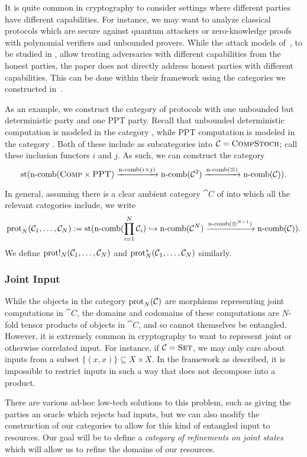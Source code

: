 It is quite common in cryptography to consider settings where different parties
have different capabilities. For instance, we may want to analyze classical
protocols which are secure against quantum attackers or zero-knowledge proofs
with polynomial verifiers and unbounded provers. While the attack models
of~\cite{broadbent-karvonen-2022}, to be studied in
, allow treating
adversaries with different capabilities from the honest parties, the paper does
not directly address honest parties with different capabilities. This can be
done within their framework using the categories we constructed
in~.

As an example, we construct the category of protocols with one unbounded but
deterministic party and one PPT party. Recall that unbounded deterministic
computation is modeled in the category , while PPT computation is
modeled in the category . Both of these include as subcategories into
${\mathcal{C}} = {\textsc{\text{CompStoch}}}$; call these inclusion functors $i$ and $j$. As such, we can
construct the category \[
  \operatorname*{st}(\operatorname*{n-comb}({\textsc{\text{Comp}}}\times{\textsc{\text{PPT}}})\xrightarrow{\operatorname*{n-comb}(i\times
    j)}\operatorname*{n-comb}({\mathcal{C}}^2)\xrightarrow{\operatorname*{n-comb}(\otimes)}\operatorname*{n-comb}({\mathcal{C}})).
\]

In general, assuming there is a clear ambient category $\cat{C}$ of
into which all the relevant categories include, we write \[
  \operatorname{prot}_{N}({\mathcal{C}}_1,\dots,{\mathcal{C}}_N) := \operatorname*{st}(\operatorname*{n-comb}(\prod_{i=1}^N
  {\mathcal{C}}_i)\hookrightarrow\operatorname*{n-comb}({\mathcal{C}}^N)\xrightarrow{\operatorname*{n-comb}(\otimes^{N-1})}\operatorname*{n-comb}({\mathcal{C}})).
\]
We define $\operatorname{prot}!_{N}({\mathcal{C}}_1,\dots,{\mathcal{C}}_N)$ and
$\operatorname{prot}^*_{N}({\mathcal{C}}_1,\dots,{\mathcal{C}}_N)$ similarly.

\subsubsection{Joint Input}

While the objects in the category $\operatorname{prot}_{N}({\mathcal{C}})$ are morphisms representing
joint computations in $\cat{C}$, the domains and codomains of these computations
are $N$-fold tensor products of objects in $\cat{C}$, and so cannot themselves be
entangled. However, it is extremely common in cryptography to want to represent
joint or otherwise correlated input. For instance, if ${\mathcal{C}} =
{\textsc{\text{Set}}}$, we may only care about inputs from a subset $\{(x, x)\}\subseteq
X\times X$. In the framework as described, it is impossible to restrict inputs
in such a way that does not decompose into a product.

There are various ad-hoc low-tech solutions to this problem, such as giving
the parties an oracle which rejects bad inputs, but we can also modify the
construction of our categories to allow for this kind of entangled input to
resources. Our goal will be to define a \emph{category of refinements on joint
states} which will allow us to refine the domains of our resources.

